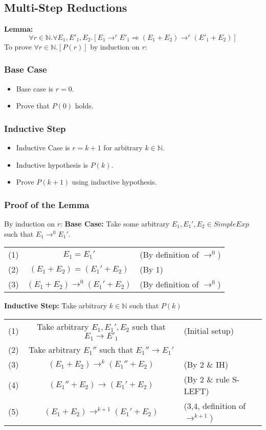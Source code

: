 \documentclass{report}
\begin{document}
\subsection*{Multi-Step Reductions}
\textbf{Lemma:}
\[\forall r \in \mathbb{N}. \forall E_1, E'_1, E_2 . [E_1 \to^r E'_1 \Rightarrow (E_1 + E_2) \to^r (E'_1 + E_2)]\]
To prove $\forall r \in \mathbb{N} . [P(r)]$ by induction on $r$:
\subsubsection*{Base Case}
\begin{itemize}
	\item Base case is $r = 0$.
	\item Prove that $P(0)$ holds.
\end{itemize}
\subsubsection*{Inductive  Step}
\begin{itemize}
	\item Inductive Case is $r = k + 1$ for arbitrary $k \in \mathbb{N}$.
	\item Inductive hypothesis is $P(k)$.
	\item Prove $P(k + 1)$ using inductive hypothesis.
\end{itemize}
\subsubsection*{Proof of the Lemma}
By induction on $r$:
\textbf{Base Case:}
Take some arbitrary $E_1, E_1', E_2 \in SimpleExp$ such that $E_1 \to^0 E_1'$.
\begin{center}
	\begin{tabular}{r c l}
		(1) & $E_1 = E_1'$                     & (By definition of $\to^0$) \\
		(2) & $(E_1 + E_2) = (E_1' + E_2)$     & (By 1)                     \\
		(3) & $(E_1 + E_2) \to^0 (E_1' + E_2)$ & (By definition of $\to^0$) \\
	\end{tabular}
\end{center}
\textbf{Inductive Step:}
Take arbitrary $k \in \mathbb{N}$ such that $P(k)$
\begin{center}
	\begin{tabular}{r c l}
		(1) & Take arbitrary $E_1, E_1', E_2$ such that $E_1 \to E'_1$ & (Initial setup)                  \\
		(2) & Take arbitrary $E_1''$ such that $E_1'' \to E_1'$        &                                  \\
		(3) & $(E_1 + E_2) \to^k (E_1'' + E_2)$                        & (By 2 \& IH)                     \\
		(4) & $(E_1'' + E_2) \to (E_1' + E_2)$                         & (By 2 \& rule S-LEFT)            \\
		(5) & $(E_1 + E_2) \to^{k+1} (E_1' + E_2)$                     & (3,4, definition of $\to^{k+1}$) \\
	\end{tabular}
\end{center}
\end{document}
